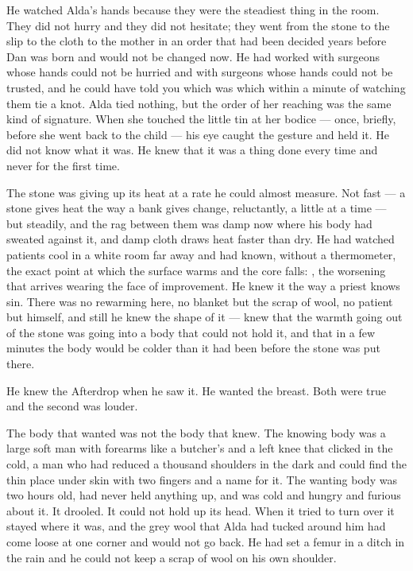 He watched Alda's hands because they were the steadiest thing in the room. They did not hurry and they did not hesitate; they went from the stone to the slip to the cloth to the mother in an order that had been decided years before Dan was born and would not be changed now. He had worked with surgeons whose hands could not be hurried and with surgeons whose hands could not be trusted, and he could have told you which was which within a minute of watching them tie a knot. Alda tied nothing, but the order of her reaching was the same kind of signature. When she touched the little tin at her bodice --- once, briefly, before she went back to the child --- his eye caught the gesture and held it. He did not know what it was. He knew that it was a thing done every time and never for the first time.

The stone was giving up its heat at a rate he could almost measure. Not fast --- a stone gives heat the way a bank gives change, reluctantly, a little at a time --- but steadily, and the rag between them was damp now where his body had sweated against it, and damp cloth draws heat faster than dry. He had watched patients cool in a white room far away and had known, without a thermometer, the exact point at which the surface warms and the core falls: , the worsening that arrives wearing the face of improvement. He knew it the way a priest knows sin. There was no rewarming here, no blanket but the scrap of wool, no patient but himself, and still he knew the shape of it --- knew that the warmth going out of the stone was going into a body that could not hold it, and that in a few minutes the body would be colder than it had been before the stone was put there.

He knew the Afterdrop when he saw it. He wanted the breast. Both were true and the second was louder.

The body that wanted was not the body that knew. The knowing body was a large soft man with forearms like a butcher's and a left knee that clicked in the cold, a man who had reduced a thousand shoulders in the dark and could find the thin place under skin with two fingers and a name for it. The wanting body was two hours old, had never held anything up, and was cold and hungry and furious about it. It drooled. It could not hold up its head. When it tried to turn over it stayed where it was, and the grey wool that Alda had tucked around him had come loose at one corner and would not go back. He had set a femur in a ditch in the rain and he could not keep a scrap of wool on his own shoulder.

